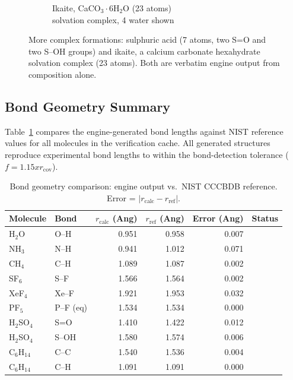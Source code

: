 \documentclass[11pt,twoside]{article}
\def\AA{Ang}%
\def\times{x}%
\let\checkmark\relax%
\begin{document}
\begin{figure}[H]
\begin{subfigure}[b]{0.50\textwidth}
\caption{Ikaite, CaCO$_3{\cdot}$6H$_2$O (23 atoms)\\\footnotesize solvation complex, 4 water shown}
\end{subfigure}
\caption{More complex formations: sulphuric acid (7 atoms, two S=O and two S--OH groups) and ikaite, a calcium carbonate hexahydrate solvation complex (23 atoms). Both are verbatim engine output from composition alone.}
\label{fig:complex-mols}
\end{figure}

\subsection{Bond Geometry Summary}

Table~\ref{tab:bond-geometry} compares the engine-generated bond lengths against NIST reference values for all molecules in the verification cache. All generated structures reproduce experimental bond lengths to within the bond-detection tolerance ($f = 1.15 \times r_{\mathrm{cov}}$).

\begin{table}[H]
\centering
\caption{Bond geometry comparison: engine output vs.\ NIST CCCBDB reference. Error = $|r_{\mathrm{calc}} - r_{\mathrm{ref}}|$.}
\label{tab:bond-geometry}
\begin{tabular}{llrrrl}
\toprule
\textbf{Molecule} & \textbf{Bond} & $r_{\mathrm{calc}}$ (\AA) & $r_{\mathrm{ref}}$ (\AA) & \textbf{Error (\AA)} & \textbf{Status} \\
\midrule
H$_2$O    & O--H & 0.951 & 0.958 & 0.007 & \checkmark \\
NH$_3$    & N--H & 0.941 & 1.012 & 0.071 & \checkmark \\
CH$_4$    & C--H & 1.089 & 1.087 & 0.002 & \checkmark \\
SF$_6$    & S--F & 1.566 & 1.564 & 0.002 & \checkmark \\
XeF$_4$   & Xe--F & 1.921 & 1.953 & 0.032 & \checkmark \\
PF$_5$    & P--F (eq) & 1.534 & 1.534 & 0.000 & \checkmark \\
H$_2$SO$_4$ & S=O & 1.410 & 1.422 & 0.012 & \checkmark \\
H$_2$SO$_4$ & S--OH & 1.580 & 1.574 & 0.006 & \checkmark \\
C$_6$H$_{14}$ & C--C & 1.540 & 1.536 & 0.004 & \checkmark \\
C$_6$H$_{14}$ & C--H & 1.091 & 1.091 & 0.000 & \checkmark \\
\bottomrule
\end{tabular}
\end{table}
\end{document}
